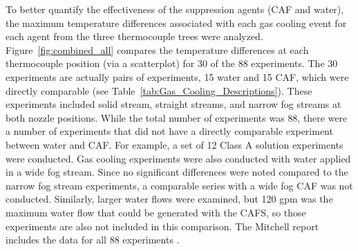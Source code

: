 \documentclass[12pt,oneside]{book}
\begin{document}
To better quantify the effectiveness of the suppression agents (CAF and water), the maximum temperature differences associated with each gas cooling event for each agent from the three thermocouple trees were analyzed. Figure~\ref{fig:combined_all} compares the temperature differences at each thermocouple position (via a scatterplot) for 30 of the 88 experiments. The 30 experiments are actually pairs of experiments, 15 water and 15 CAF, which were directly comparable (see Table~\ref{tab:Gas_Cooling_Descriptions}). These experiments included solid stream, straight streams, and narrow fog streams at both nozzle positions. While the total number of experiments was 88, there were a number of experiments that did not have a directly comparable experiment between water and CAF. For example, a set of 12 Class A solution experiments were conducted. Gas cooling experiments were also conducted with water applied in a wide fog stream. Since no significant differences were noted compared to the narrow fog stream experiments, a comparable series with a wide fog CAF was not conducted. Similarly, larger water flows were examined, but 120 gpm was the maximum water flow that could be generated with the CAFS, so those experiments are also not included in this comparison. The Mitchell report includes the data for all 88 experiments \cite{Mitchell:1}. 
   
\end{document}

